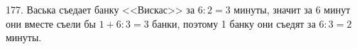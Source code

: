 177. Васька съедает банку <<Вискас>> за $6:2=3$ минуты, значит за 6 минут они вместе съели бы $1+6:3=3$ банки, поэтому 1 банку они съедят за $6:3=2$ минуты.\\
